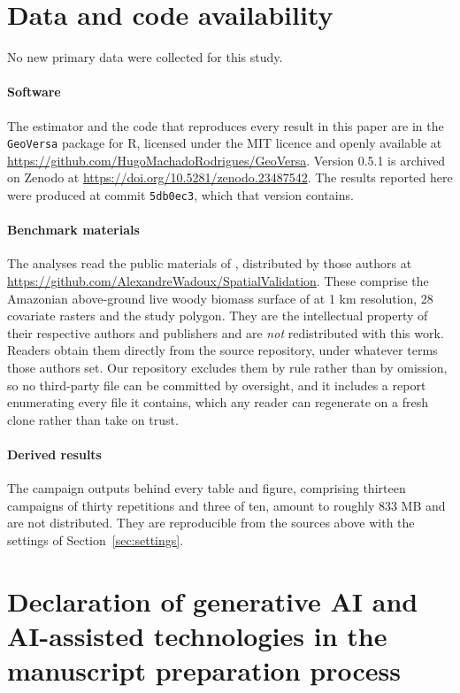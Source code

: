 \documentclass[preprint,12pt,authoryear]{elsarticle}
\begin{document}
\section*{Data and code availability}

No new primary data were collected for this study.

\paragraph{Software} The estimator and the code that reproduces every result in
this paper are in the \texttt{GeoVersa} package for R, licensed under the MIT licence and openly available at
\url{https://github.com/HugoMachadoRodrigues/GeoVersa}. Version 0.5.1 is
archived on Zenodo at \url{https://doi.org/10.5281/zenodo.23487542}. The
results reported here were produced at commit \texttt{5db0ec3}, which that
version contains.

\paragraph{Benchmark materials} The analyses read the public materials of
\citet{wadoux2021}, distributed by those authors at
\url{https://github.com/AlexandreWadoux/SpatialValidation}. These comprise the
Amazonian above-ground live woody biomass surface of \citet{baccini2012} at 1 km
resolution, 28 covariate rasters and the study polygon. They are the
intellectual property of their respective authors and publishers and are
\emph{not} redistributed with this work. Readers obtain them directly from the
source repository, under whatever terms those authors set. Our repository
excludes them by rule rather than by omission, so no third-party file can be
committed by oversight, and it includes a report enumerating every file it
contains, which any reader can regenerate on a fresh clone rather than take on
trust.

\paragraph{Derived results} The campaign outputs behind every table and figure,
comprising thirteen campaigns of thirty repetitions and three of ten, amount to
roughly 833 MB and are not distributed. They are reproducible from the sources
above with the settings of Section~\ref{sec:settings}.

\section*{Declaration of generative AI and AI-assisted technologies in the
manuscript preparation process}
\end{document}
